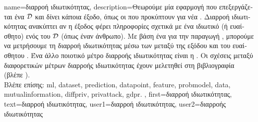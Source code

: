 {name={\foreignlanguage{greek}{διαρροή ιδιωτικότητας}},
	description={\foreignlanguage{greek}{Θεωρούμε μία εφαρμογή} 
		 \foreignlanguage{greek}{που επεξεργάζεται ένα} 
		 $\mathcal{D}$ \foreignlanguage{greek}{και δίνει κάποια έξοδο, όπως οι}  
		\foreignlanguage{greek}{που προκύπτουν για νέα} . \foreignlanguage{greek}{Διαρροή ιδιωτικότητας ανακύπτει 
		αν η έξοδος φέρει πληροφορίες σχετικά με ένα ιδιωτικό (ή ευαίσθητο)}  \foreignlanguage{greek}{ενός} 
		 \foreignlanguage{greek}{του $\mathcal{D}$ (όπως έναν άνθρωπο). Με βάση ένα}  
		\foreignlanguage{greek}{για την παραγωγή} , \foreignlanguage{greek}{μπορούμε να μετρήσουμε τη διαρροή ιδιωτικότητας 
		μέσω των}  \foreignlanguage{greek}{μεταξύ της εξόδου και του ευαίσθητου} 
		. \foreignlanguage{greek}{Ένα άλλο ποιοτικό μέτρο διαρροής ιδιωτικότητας είναι η}  
		. \foreignlanguage{greek}{Οι σχέσεις μεταξύ διαφορετικών μέτρων διαρροής ιδιωτικότητας έχουν μελετηθεί  
		στη βιβλιογραφία (βλέπε} \cite{InfThDiffPriv}).\\
		\foreignlanguage{greek}{Βλέπε επίσης:} \gls{ml}, \gls{dataset}, \gls{prediction}, \gls{datapoint}, \gls{feature}, \gls{probmodel}, \gls{data}, 
		\gls{mutualinformation}, \gls{diffpriv}, \gls{privattack}, \gls{gdpr}. }, 
	first={\foreignlanguage{greek}{διαρροή ιδιωτικότητας}}, 
	text={\foreignlanguage{greek}{διαρροή ιδιωτικότητας}},
	user1={\foreignlanguage{greek}{διαρροή ιδιωτικότητας}}, %
   	user2={\foreignlanguage{greek}{διαρροής ιδιωτικότητας}} %
}

